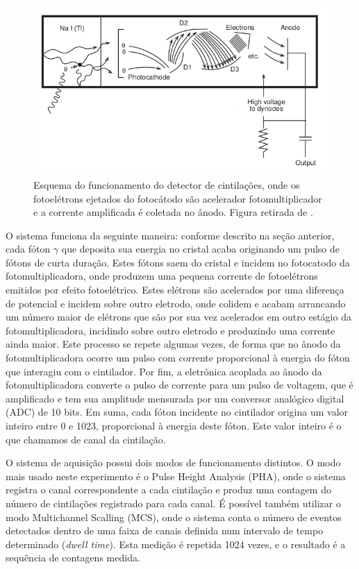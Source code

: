 \documentclass[a4paper, 11pt, notitlepage]{article}
\numberwithin{equation}{section}  %
\begin{document}
\graphicspath{{relatorio/}}
\begin{figure}[!htb]
\centering
\includegraphics[scale=0.40]{cintilador.png}
\caption{Esquema do funcionamento do detector de cintilações, onde os fotoelétrons ejetados do fotocátodo são acelerador fotomultiplicador e a corrente amplificada é coletada no ânodo. Figura retirada de \cite{peterson1996}.}
\label{fig:esquema.cintilador}
\end{figure}

O sistema funciona da seguinte maneira: conforme descrito na seção anterior, cada fóton $\gamma$ que deposita sua energia no cristal acaba originando um pulso de fótons de curta duração. Estes fótons saem do cristal e incidem no fotocatodo da fotomultiplicadora, onde produzem uma pequena corrente de fotoelétrons emitidos por efeito fotoelétrico. Estes elétrons são acelerados por uma diferença de potencial e incidem sobre outro eletrodo, onde colidem e acabam arrancando um número maior de elétrons que são por sua vez acelerados em outro estágio da fotomultiplicadora, incidindo sobre outro eletrodo e produzindo uma corrente ainda maior. Este processo se repete algumas vezes, de forma que no ânodo da fotomultiplicadora ocorre um pulso com corrente proporcional à energia do fóton que interagiu com o cintilador. Por fim, a eletrônica acoplada ao ânodo da fotomultiplicadora converte o pulso de corrente para um pulso de voltagem, que é amplificado e tem sua amplitude mensurada por um conversor analógico digital (ADC) de 10 bits. Em suma, cada fóton incidente no cintilador origina um valor inteiro entre 0 e 1023, proporcional à energia deste fóton. Este valor inteiro é o que chamamos de canal da cintilação.

O sistema de aquisição possui dois modos de funcionamento distintos. O modo mais usado neste experimento é o Pulse Height Analysis (PHA), onde o sistema registra o canal correspondente a cada cintilação e produz uma contagem do número de cintilações registrado para cada canal. É possível também utilizar o modo Multichannel Scalling (MCS), onde o sistema conta o número de eventos detectados dentro de uma faixa de canais definida num intervalo de tempo determinado (\textit{dwell time}). Esta medição é repetida 1024 vezes, e o resultado é a sequência de contagens medida.
\end{document}
